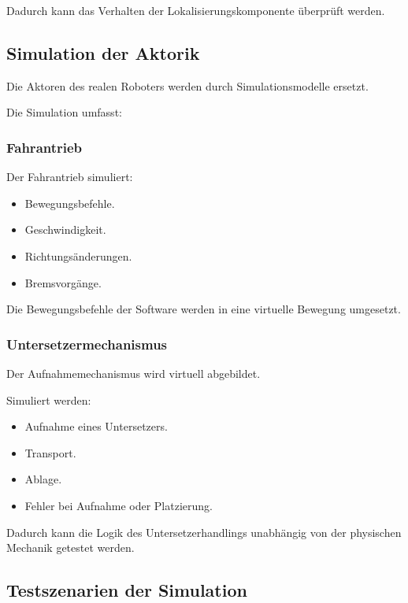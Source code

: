 \documentclass[
  a4paper,
  12pt,
  DIV=12,        %
  parskip=half,  %
  headings=small %
]{scrartcl}
\theoremstyle{definition}
\providecommand{\tightlist}{%
  \setlength{\itemsep}{0pt}\setlength{\parskip}{0pt}}
\theoremstyle{definition}
\begin{document}
Dadurch kann das Verhalten der Lokalisierungskomponente überprüft
werden.

\subsection{Simulation der Aktorik}\label{simulation-der-aktorik}

Die Aktoren des realen Roboters werden durch Simulationsmodelle ersetzt.

Die Simulation umfasst:

\subsubsection{Fahrantrieb}\label{fahrantrieb}

Der Fahrantrieb simuliert:

\begin{itemize}
\tightlist
\item
  Bewegungsbefehle.
\item
  Geschwindigkeit.
\item
  Richtungsänderungen.
\item
  Bremsvorgänge.
\end{itemize}

Die Bewegungsbefehle der Software werden in eine virtuelle Bewegung
umgesetzt.

\subsubsection{Untersetzermechanismus}\label{untersetzermechanismus}

Der Aufnahmemechanismus wird virtuell abgebildet.

Simuliert werden:

\begin{itemize}
\tightlist
\item
  Aufnahme eines Untersetzers.
\item
  Transport.
\item
  Ablage.
\item
  Fehler bei Aufnahme oder Platzierung.
\end{itemize}

Dadurch kann die Logik des Untersetzerhandlings unabhängig von der
physischen Mechanik getestet werden.

\subsection{Testszenarien der
Simulation}\label{testszenarien-der-simulation}
\end{document}
